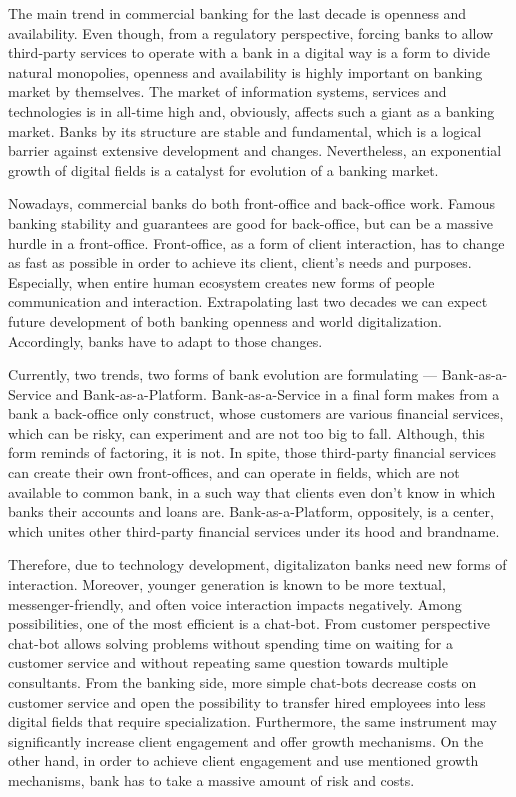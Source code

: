 

The main trend in commercial banking for the last decade is openness and availability.
Even though, from a regulatory perspective, forcing banks to allow third-party services to operate with a bank in a digital way is a form to divide natural monopolies, openness and availability is highly important on banking market by themselves.
The market of information systems, services and technologies is in all-time high and, obviously, affects such a giant as a banking market.
Banks by its structure are stable and fundamental, which is a logical barrier against extensive development and changes.
Nevertheless, an exponential growth of digital fields is a catalyst for evolution of a banking market.

Nowadays, commercial banks do both front-office and back-office work.
Famous banking stability and guarantees are good for back-office, but can be a massive hurdle in a front-office.
Front-office, as a form of client interaction, has to change as fast as possible in order to achieve its client, client's needs and purposes.
Especially, when entire human ecosystem creates new forms of people communication and interaction.
Extrapolating last two decades we can expect future development of both banking openness and world digitalization.
Accordingly, banks have to adapt to those changes.

Currently, two trends, two forms of bank evolution are formulating — Bank-as-a-Service and Bank-as-a-Platform.
Bank-as-a-Service in a final form makes from a bank a back-office only construct, whose customers are various financial services, which can be risky, can experiment and are not too big to fall.
Although, this form reminds of factoring, it is not.
In spite, those third-party financial services can create their own front-offices, and can operate in fields, which are not available to common bank, in a such way that clients even don't know in which banks their accounts and loans are.
Bank-as-a-Platform, oppositely, is a center, which unites other third-party financial services under its hood and brandname.

Therefore, due to technology development, digitalizaton banks need new forms of interaction.
Moreover, younger generation is known to be more textual, messenger-friendly, and often voice interaction impacts negatively.
Among possibilities, one of the most efficient is a chat-bot.
From customer perspective chat-bot allows solving problems without spending time on waiting for a customer service and without repeating same question towards multiple consultants.
From the banking side, more simple chat-bots decrease costs on customer service and open the possibility to transfer hired employees into less digital fields that require specialization.
Furthermore, the same instrument may significantly increase client engagement and offer growth mechanisms.
On the other hand, in order to achieve client engagement and use mentioned growth mechanisms, bank has to take a massive amount of risk and costs.

